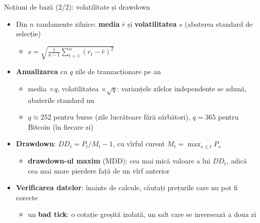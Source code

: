 \begin{frame}{Noțiuni de bază (2/2): volatilitate și drawdown}
\itemsize{\small}
\begin{itemize}
    \item Din $n$ randamente zilnice: \textbf{media} $\bar r$ și \textbf{volatilitatea} $s$ (abaterea standard de selecție)
    \begin{itemize}
        \item $s = \sqrt{\frac{1}{n-1} \sum_{t=1}^n (r_t - \bar r)^2}$
    \end{itemize}
    \item \textbf{Anualizarea} cu $q$ zile de tranzacționare pe an
    \begin{itemize}
        \item media $\times q$, volatilitatea $\times \sqrt{q}$: varianțele zilelor independente se adună, abaterile standard nu
        \item $q \approx 252$ pentru burse (zile lucrătoare fără sărbători), $q = 365$ pentru Bitcoin (în fiecare zi)
    \end{itemize}
    \item \textbf{Drawdown}: $DD_t = P_t / M_t - 1$, cu vîrful curent $M_t = \max_{s \le t} P_s$
    \begin{itemize}
        \item \textbf{drawdown-ul maxim} (MDD): cea mai mică valoare a lui $DD_t$, adică cea mai mare pierdere față de un vîrf anterior
    \end{itemize}
    \item \textbf{Verificarea datelor}: înainte de calcule, căutați prețurile care nu pot fi corecte
    \begin{itemize}
        \item un \textbf{bad tick}: o cotație greșită izolată, un salt care se inversează a doua zi
    \end{itemize}
\end{itemize}
\end{frame}

